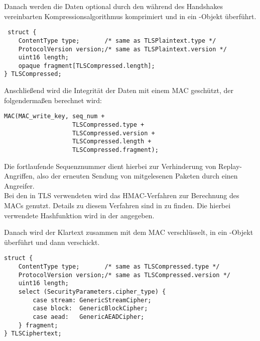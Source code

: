 Danach werden die Daten optional durch den während des Handshakes vereinbarten Kompressionsalgorithmus komprimiert und in ein -Objekt überführt.

\begin{lstlisting}
 struct {
	ContentType type;       /* same as TLSPlaintext.type */
	ProtocolVersion version;/* same as TLSPlaintext.version */
	uint16 length;
	opaque fragment[TLSCompressed.length];
} TLSCompressed;
\end{lstlisting}

Anschließend wird die Integrität der Daten mit einem MAC geschützt, der folgendermaßen berechnet wird:
\begin{lstlisting}
MAC(MAC_write_key, seq_num +
				   TLSCompressed.type +
				   TLSCompressed.version +
				   TLSCompressed.length +
				   TLSCompressed.fragment);
\end{lstlisting}
Die fortlaufende Sequenznummer  dient hierbei zur Verhinderung von Replay-Angriffen, also der erneuten Sendung von mitgelesenen Paketen durch einen Angreifer.\\
Bei den in TLS verwendeten \ciphersuites{} wird das HMAC-Verfahren zur Berechnung des MACs genutzt. Details zu diesem Verfahren sind in \cite{hmac97} zu finden. Die hierbei verwendete Hashfunktion wird in der \ciphersuite{} angegeben. 

Danach wird der Klartext zusammen mit dem MAC verschlüsselt, in ein -Objekt überführt und dann verschickt.

\begin{lstlisting}
struct {
	ContentType type;       /* same as TLSCompressed.type */
	ProtocolVersion version;/* same as TLSCompressed.version */
	uint16 length;
	select (SecurityParameters.cipher_type) {
	    case stream: GenericStreamCipher;
	    case block:  GenericBlockCipher;
	    case aead:   GenericAEADCipher;
	} fragment;
} TLSCiphertext;
\end{lstlisting}

